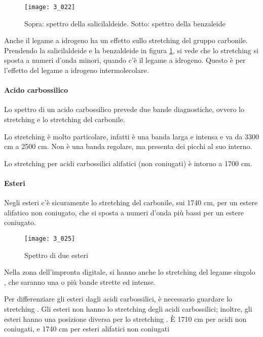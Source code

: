 \begin{figure}[H]
    \texttt{[image: 3\_022]}
    \caption{Sopra: spettro della salicilaldeide. Sotto: spettro della benzaleide}
    \label{fig:IRald}
\end{figure}


Anche il legame a idrogeno ha un effetto sullo stretching del gruppo
carbonile. Prendendo la salicilaldeide e la benzaldeide in figura \ref{fig:IRald}, si vede che lo
stretching  si sposta a numeri d'onda minori, quando c'è il legame a idrogeno.
Questo è per l'effetto del legame a idrogeno intermolecolare.

\paragraph{Acido carbossilico}

Lo spettro di un acido carbossilico prevede due bande diagnostiche,
ovvero lo stretching  e lo stretching del carbonile.


Lo stretching  è molto particolare, infatti è una banda larga e
intensa e va da 3300 cm a 2500 cm. Non è una banda regolare, ma
presenta dei picchi al suo interno.

Lo stretching  per acidi carbossilici alifatici (non coniugati) è
intorno a 1700 cm.

\paragraph{Esteri}

Negli esteri c'è sicuramente lo stretching del carbonile, sui 1740 cm,
per un estere alifatico non coniugato, che si sposta a numeri d'onda più
bassi per un estere coniugato.

\begin{figure}[H]
    \texttt{[image: 3\_025]}
    \caption{Spettro di due esteri}
\end{figure}

Nella zona dell'impronta digitale, si hanno anche lo stretching del
legame singolo , che saranno una o più bande strette ed intense.

Per differenziare gli esteri dagli acidi carbossilici, è necessario guardare lo stretching .
Gli esteri non hanno lo stretching  degli acidi carbossilici; inoltre,
gli esteri hanno una posizione diversa per lo stretching . È 1710
cm per acidi non coniugati, e 1740 cm per esteri alifatici non
coniugati

